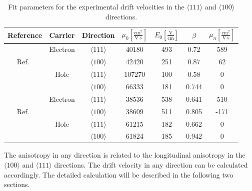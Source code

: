 \begin{table}[tbhp]
  \centering
  \begin{tabular*}{\textwidth}{ccccccc}\hline\hline
     Reference & Carrier & Direction & $\mu_{0} \left[ \frac{\mbox{cm}^{2}}{\mbox{V}\cdot\mbox{s}} \right]$ & $E_{0} \left[ \frac{\mbox{V}}{\mbox{cm}} \right]$ & $\beta$ & $\mu_{n} \left[ \frac{\mbox{cm}^{2}}{\mbox{V}\cdot\mbox{s}} \right]$ \\\hline
& Electron & $\langle111\rangle$ & 40180 & 493 & 0.72 & 589 \\
Ref.~\cite{miha}& & $\langle100\rangle$ & 42420 & 251 & 0.87 & 62\\
& Hole & $\langle111\rangle$ & 107270 & 100 & 0.58 & 0 \\
& & $\langle100\rangle$ & 66333 & 181 & 0.744 & 0 \\\hline\hline
& Electron & $\langle111\rangle$ & 38536 & 538 & 0.641 & 510 \\
Ref.~\cite{bart}& & $\langle100\rangle$ & 38609 & 511 & 0.805 & -171\\ 
& Hole & $\langle111\rangle$ & 61215 & 182 & 0.662 & 0 \\
& & $\langle100\rangle$ & 61824 & 185 & 0.942 & 0 \\\hline\hline
  \end{tabular*}
  \caption{Fit parameters for the experimental drift velocities in the 
$\langle111\rangle$ and $\langle100\rangle$ directions.}
\label{tab:pss:pars}
\end{table}

The anisotropy in any direction is related to the longitudinal anisotropy in the $\langle100\rangle$ and $\langle111\rangle$ directions. The drift velocity in any direction can be calculated accordingly. The detailed calculation will be described in the following two sections.

